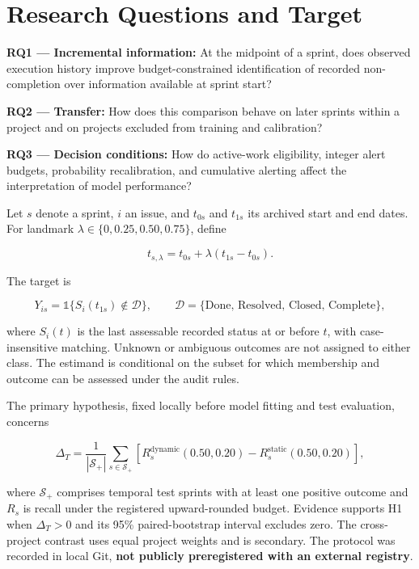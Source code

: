 \section{Research Questions and Target}\label{research-questions-and-target}

\textbf{RQ1 --- Incremental information:} At the midpoint of a sprint, does observed execution history improve budget-constrained identification of recorded non-completion over information available at sprint start?

\textbf{RQ2 --- Transfer:} How does this comparison behave on later sprints within a project and on projects excluded from training and calibration?

\textbf{RQ3 --- Decision conditions:} How do active-work eligibility, integer alert budgets, probability recalibration, and cumulative alerting affect the interpretation of model performance?

Let \(s\) denote a sprint, \(i\) an issue, and \(t_{0s}\) and \(t_{1s}\) its archived start and end dates. For landmark \(\lambda\in\{0,0.25,0.50,0.75\}\), define

\[
t_{s,\lambda}=t_{0s}+\lambda(t_{1s}-t_{0s}).
\]

The target is

\[
Y_{is}=\mathbb{1}\{S_i(t_{1s})\notin\mathcal D\},
\qquad \mathcal D=\{\text{Done, Resolved, Closed, Complete}\},
\]

where \(S_i(t)\) is the last assessable recorded status at or before \(t\), with case-insensitive matching. Unknown or ambiguous outcomes are not assigned to either class. The estimand is conditional on the subset for which membership and outcome can be assessed under the audit rules.

The primary hypothesis, fixed locally before model fitting and test evaluation, concerns

\[
\Delta_T=\frac{1}{|\mathcal S_+|}\sum_{s\in\mathcal S_+}
\left[R_s^{\mathrm{dynamic}}(0.50,0.20)
-R_s^{\mathrm{static}}(0.50,0.20)\right],
\]

where \(\mathcal S_+\) comprises temporal test sprints with at least one positive outcome and \(R_s\) is recall under the registered upward-rounded budget. Evidence supports H1 when \(\Delta_T>0\) and its 95\% paired-bootstrap interval excludes zero. The cross-project contrast uses equal project weights and is secondary. The protocol was recorded in local Git, \textbf{not publicly preregistered with an external registry}.
